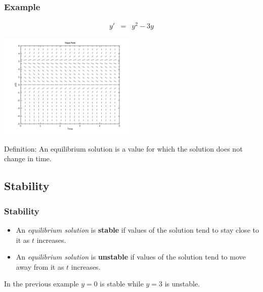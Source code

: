 \begin{frame}
  \frametitle{Example}

  \vspace*{-4em}

  \begin{eqnarray*}
    y' & = & y^2 - 3y
  \end{eqnarray*}

  \includegraphics[height=5cm]{img/week1Day2SlopeField3}

  {\color{red}Definition: An equilibrium solution is a value for which the
  solution does not change in time.}


\end{frame}

\subsection{Stability}

\begin{frame}
  \frametitle{Stability}

  \begin{itemize}
  \item An \textit{equilibrium solution} is {\color{red}\textbf{stable}} if values
    of the solution tend to stay close to it as $t$ increases.
  \item An \textit{equilibrium solution} is {\color{red}\textbf{unstable}} if
    values of the solution tend to move away from it as $t$ increases.
  \end{itemize}

  In the previous example $y=0$ is stable while $y=3$ is unstable.

\end{frame}



